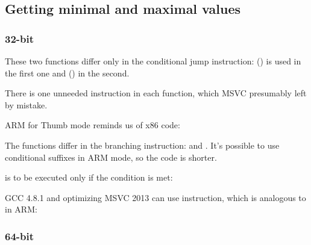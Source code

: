﻿\subsection{Getting minimal and maximal values}

\subsubsection{32-bit}






These two functions differ only in the conditional jump instruction: 
 () is used in the first one
and  () in the second.

\myindex{\CompilerAnomaly}
\label{MSVC_double_JMP_anomaly}

There is one unneeded \JMP instruction in each function, which MSVC presumably left by mistake.


ARM for Thumb mode reminds us of x86 code:




The functions differ in the branching instruction:  and .
It's possible to use conditional suffixes in ARM mode, so the code is shorter.

 is to be executed only if the condition is met:



\Optimizing GCC 4.8.1 and optimizing MSVC 2013 can use  instruction, which is analogous to  in ARM:



\subsubsection{64-bit}

